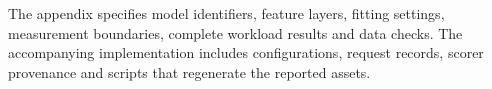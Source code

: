 The appendix specifies model identifiers, feature layers, fitting settings, measurement boundaries, complete workload results and data checks. The accompanying implementation includes configurations, request records, scorer provenance and scripts that regenerate the reported assets.
